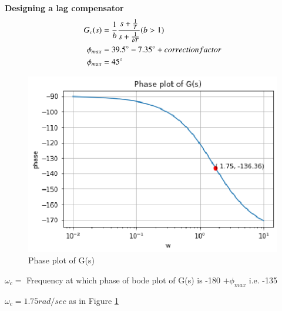 \textbf{Designing a lag compensator}
\begin{align}
   G_{c}(s) &=  \frac{1}{b}\frac{s + \frac{1}{T}}{s + \frac{1}{bT}} (b>1)  \label{eq:ee18btech11001_11}
   \\
   \phi_{max}  &= 39.5\degree -7.35\degree + correction factor
   \\
   \phi_{max} &= 45 \degree
\end{align}
\begin{figure}[!ht]
\centering
    \includegraphics[width=\columnwidth]{./figs/ee18btech11001/ee18btech11001_3.eps}
  \caption{Phase plot of G(s)}
  \label{fig:ee18btech11001_fig2}
\end{figure}

$\omega_{c} = $ Frequency at which phase of bode plot of G(s) is -180 $+ \phi_{max}$ i.e. -135 \degree

$\omega_{c}  = 1.75 rad/sec$  as in Figure \ref{fig:ee18btech11001_fig2}


